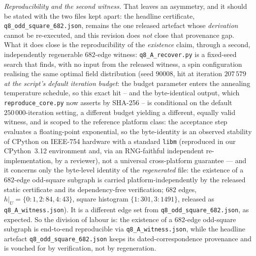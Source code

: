 \documentclass[12pt,a4paper]{article}
\theoremstyle{definition}
\begin{document}
\medskip\noindent\emph{Reproducibility and the second witness.} That leaves an
asymmetry, and it should be stated with the two files kept apart: the
headline certificate, \texttt{q8\_odd\_square\_682.json}, remains the one
released artefact whose \emph{derivation} cannot be re-executed, and this
revision does \emph{not} close that provenance gap. What it does close is
the reproducibility of the \emph{existence} claim, through a second,
independently regenerable $682$-edge witness:
\texttt{q8\_A\_recover.py} is a fixed-seed search that finds, with no input from
the released witness, a spin configuration realising the same optimal field
distribution (seed $90008$, hit at iteration $207\,579$ \emph{at the
script's default iteration budget}: the budget parameter enters the annealing
temperature schedule, so this exact hit -- and the byte-identical output,
which \texttt{reproduce\_core.py} now asserts by SHA-256 -- is conditional
on the default $250\,000$-iteration setting, a different budget yielding a
different, equally valid witness, and is scoped to the reference platform
class: the acceptance step evaluates a floating-point exponential, so the
byte-identity is an observed stability of CPython on IEEE-754 hardware with
a standard \texttt{libm} (reproduced in our CPython~3.12 environment and,
via an RNG-faithful independent re-implementation, by a reviewer), not a
universal cross-platform guarantee --- and it concerns only the byte-level
identity of the \emph{regenerated} file: the existence of a $682$-edge
odd-square subgraph is carried platform-independently by the released
static certificate and its dependency-free verification; $682$ edges,
$h|_U=\{0{:}1,2{:}84,4{:}43\}$, square histogram $\{1{:}301,3{:}1491\}$,
released as \texttt{q8\_A\_witness.json}). It is a different edge set
from \texttt{q8\_odd\_square\_682.json}, as expected. So the division of
labour is: the existence of a $682$-edge odd-square subgraph is
end-to-end reproducible via \texttt{q8\_A\_witness.json}, while the
headline artefact \texttt{q8\_odd\_square\_682.json} keeps its
dated-correspondence provenance and is vouched for by verification, not
by regeneration.
\end{document}
